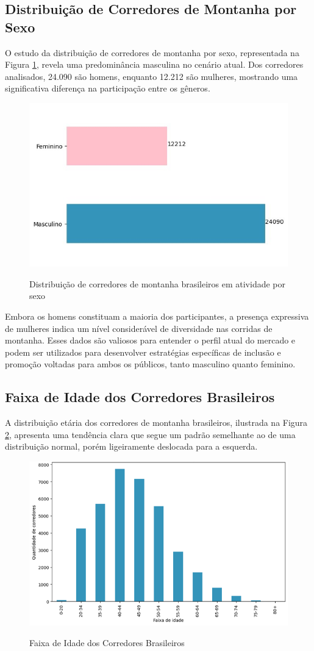 \subsection{Distribuição de Corredores de Montanha por Sexo}

O estudo da distribuição de corredores de montanha por sexo, representada na Figura \ref{fig:sexo}, revela uma predominância masculina no cenário atual. Dos corredores analisados, 24.090 são homens, enquanto 12.212 são mulheres, mostrando uma significativa diferença na participação entre os gêneros.

\begin{figure}
\centering
\caption{Distribuição de corredores de montanha brasileiros em atividade por sexo}
\includegraphics[width = 0.6\linewidth]{relatorios/paraty/figuras/Grafico_Corredores_Sexo.jpg}
\label{fig:sexo}
\end{figure}

Embora os homens constituam a maioria dos participantes, a presença expressiva de mulheres indica um nível considerável de diversidade nas corridas de montanha. Esses dados são valiosos para entender o perfil atual do mercado e podem ser utilizados para desenvolver estratégias específicas de inclusão e promoção voltadas para ambos os públicos, tanto masculino quanto feminino.

\subsection{Faixa de Idade dos Corredores Brasileiros}

A distribuição etária dos corredores de montanha brasileiros, ilustrada na Figura \ref{fig:corredores_idade}, apresenta uma tendência clara que segue um padrão semelhante ao de uma distribuição normal, porém ligeiramente deslocada para a esquerda.

\begin{figure}
\centering
\caption{Faixa de Idade dos Corredores Brasileiros}
\includegraphics[width = 0.7\linewidth]{relatorios/paraty/figuras/Grafico_corredores_idade.png}
\label{fig:corredores_idade}
\end{figure}

